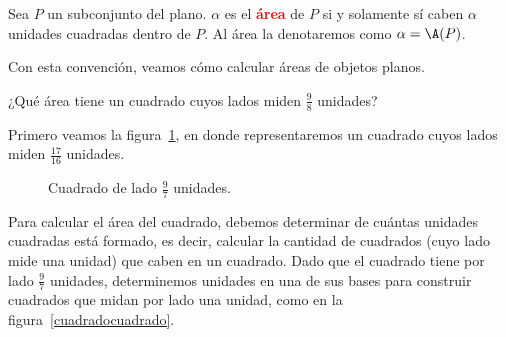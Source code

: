 \begin{df}\label{dfárea}
Sea $P$ un subconjunto del plano. $\alpha$ es el \textcolor{red}{\textbf{área}} de $P$ si y solamente sí caben $\alpha$ unidades cuadradas dentro de $P$. Al área la denotaremos como $\alpha = \A(P)$.
\end{df}

Con esta convención, veamos cómo calcular áreas de objetos planos.

\begin{ej}
¿Qué área tiene un cuadrado cuyos lados miden $\frac{9}{8}$ unidades?
\end{ej}
\begin{pba}


Primero veamos la figura~\ref{cuadrado97}, en donde representaremos un cuadrado cuyos lados miden $\frac {17}{16}$ unidades.

\begin{figure}[!h]
\begin{center}
\caption{Cuadrado de lado $\frac{9}{7}$ unidades.}\label{cuadrado97}
\end{center}
\end{figure}

Para calcular el área del cuadrado, debemos determinar de cuántas unidades cuadradas está formado, es decir, calcular la cantidad de cuadrados (cuyo lado mide una unidad) que caben en un cuadrado. Dado que el cuadrado tiene por lado $\frac{9}{7}$ unidades, determinemos unidades en una de sus bases para construir cuadrados que midan por lado una unidad, como en la figura~\ref{cuadradocuadrado}. \\

\begin{figure}[!h]
\begin{center}
\end{center}
\end{figure}
\end{pba}
